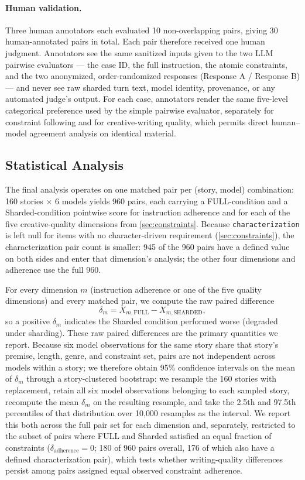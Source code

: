 \paragraph{Human validation.}
Three human annotators each evaluated 10 non-overlapping pairs, giving 30 human-annotated pairs in total. Each pair therefore received one human judgment. Annotators see the same sanitized inputs given to the two LLM pairwise evaluators — the case ID, the full instruction, the atomic constraints, and the two anonymized, order-randomized responses (Response A / Response B) — and never see raw sharded turn text, model identity, provenance, or any automated judge's output. For each case, annotators render the same five-level categorical preference used by the simple pairwise evaluator, separately for constraint following and for creative-writing quality, which permits direct human--model agreement analysis on identical material.

\subsection{Statistical Analysis}
\label{sec:stats}

The final analysis operates on one matched pair per (story, model) combination: 160 stories $\times$ 6 models yields 960 pairs, each carrying a FULL-condition and a Sharded-condition pointwise score for instruction adherence and for each of the five creative-quality dimensions from \cref{sec:constraints}. Because \texttt{characterization} is left null for items with no character-driven requirement (\cref{sec:constraints}), the characterization pair count is smaller: 945 of the 960 pairs have a defined value on both sides and enter that dimension's analysis; the other four dimensions and adherence use the full 960.

For every dimension $m$ (instruction adherence or one of the five quality dimensions) and every matched pair, we compute the raw paired difference
\begin{equation}
    \label{eq:delta}
    \delta_m = X_{m,\mathrm{FULL}} - X_{m,\mathrm{SHARDED}},
\end{equation}
so a positive $\delta_m$ indicates the Sharded condition performed worse (degraded under sharding). These raw paired differences are the primary quantities we report. Because six model observations for the same story share that story's premise, length, genre, and constraint set, pairs are not independent across models within a story; we therefore obtain 95\% confidence intervals on the mean of $\delta_m$ through a story-clustered bootstrap: we resample the 160 stories with replacement, retain all six model observations belonging to each sampled story, recompute the mean $\delta_m$ on the resulting resample, and take the 2.5th and 97.5th percentiles of that distribution over 10{,}000 resamples as the interval. We report this both across the full pair set for each dimension and, separately, restricted to the subset of pairs where FULL and Sharded satisfied an equal fraction of constraints ($\delta_{\text{adherence}} = 0$; 180 of 960 pairs overall, 176 of which also have a defined characterization pair), which tests whether writing-quality differences persist among pairs assigned equal observed constraint adherence.

